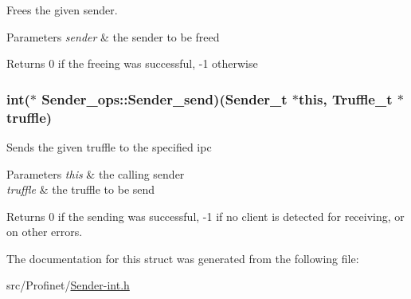 Frees the given sender. 


\begin{DoxyParams}{Parameters}
{\em sender} & the sender to be freed\\
\hline
\end{DoxyParams}
\begin{DoxyReturn}{Returns}
0 if the freeing was successful, -\/1 otherwise 
\end{DoxyReturn}
\hypertarget{struct_sender__ops_a770fd3ebe41dcd7fd5e8f84eb25a888a}{
\subsubsection[{Sender\-\_\-send}]{\setlength{\rightskip}{0pt plus 5cm}int($\ast$ Sender\-\_\-ops\-::\-Sender\-\_\-send)({\bf Sender\-\_\-t} $\ast$this, {\bf Truffle\-\_\-t} $\ast$truffle)}}\label{struct_sender__ops_a770fd3ebe41dcd7fd5e8f84eb25a888a}
Sends the given truffle to the specified ipc


\begin{DoxyParams}{Parameters}
{\em this} & the calling sender \\
\hline
{\em truffle} & the truffle to be send\\
\hline
\end{DoxyParams}
\begin{DoxyReturn}{Returns}
0 if the sending was successful, -\/1 if no client is detected for receiving, or on other errors. 
\end{DoxyReturn}


The documentation for this struct was generated from the following file\-:\begin{DoxyCompactItemize}
\item 
src/\-Profinet/\hyperlink{_sender-int_8h}{Sender-\/int.\-h}\end{DoxyCompactItemize}
